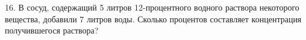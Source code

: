 16. В сосуд, содержащий 5 литров 12-процентного водного раствора некоторого вещества, добавили 7 литров воды. Сколько процентов составляет концентрация получившегося раствора?\\
